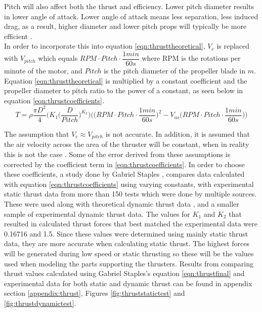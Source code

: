 \documentclass[../main.tex]{subfiles}
\begin{document}
Pitch will also affect both the thrust and efficiency. Lower pitch diameter results in  lower angle of attack. Lower angle of attack means less separation, less induced drag, as a result, higher diameter and lower pitch props will typically be more efficient \cite{thrusteq}.\\
	
In order to incorporate this into equation \ref{eqn:thrusttheoretical}, $V_{e}$ is replaced with $V_{pitch}$ which equals \linebreak $RPM\cdot Pitch \cdot \dfrac{1min}{60s}$ where RPM is the rotations per minute of the motor, and $Pitch$ is the pitch diameter of the propeller blade in $m$. Equation \ref{eqn:thrusttheoretical} is multiplied by a constant coefficient and the propeller diameter to pitch ratio to the power of a constant, as seen below in equation \ref{eqn:thrustcoefficients}. \\
	\begin{equation}
    \label{eqn:thrustcoefficients}
	T = \rho \dfrac{\pi D^2}{4}\Bigg(K_1\Big(\dfrac{D}{Pitch}\Big)^{K_2}\Bigg)\Bigg(\Big(RPM\cdot Pitch \cdot \dfrac{1min}{60s}\Big)^2 - V_{as}\Big(RPM\cdot Pitch \cdot \dfrac{1min}{60s}\Big)\Bigg)
	\end{equation}

The assumption that $V_{e} \approx V_{pitch}$ is not accurate. In addition, it is assumed that the air velocity across the area of the thruster will be constant, when in reality this is not the case \cite{thrusteq}. Some of the error derived from these assumptions is corrected by the coefficient term in \ref{eqn:thrustcoefficients}. In order to choose these coefficients, a study done by Gabriel Staples \cite{thrusteq} \cite{thrustaccuracy}, compares data calculated with equation \ref{eqn:thrustcoefficients} using varying constants, with experimental static thrust data from more than 150 tests which were done by multiple sources. These were used along with theoretical dynamic thrust data \cite{thrustlegit}, and a smaller sample of experimental dynamic thrust data. The values for $K_1$ and $K_2$ that resulted in calculated thrust forces that best matched the experimental data were 0.16716 and 1.5. Since these values were determined using mainly static thrust data, they are more accurate when calculating static thrust. The highest forces will be generated during low speed or static thrusting so these will be the values used when modeling the parts supporting the thrusters. Results from comparing thrust values calculated using Gabriel Staples's equation \ref{eqn:thrustfinal} and experimental data for both static and dynamic thrust can be found in appendix section \ref{appendix:thrust}, Figures \ref{fig:thruststatictest} and \ref{fig:thrustdynamictest}. \\
\end{document}
